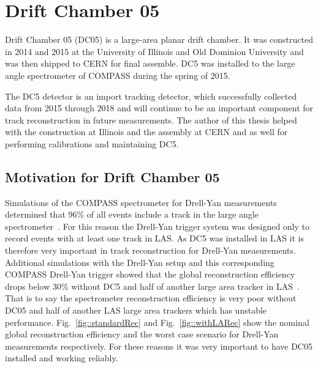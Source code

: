 \chapter{Drift Chamber 05} \label{ch::DC05}
\ifpdf
\graphicspath{{Chapters/DC5/Figs/Raster/}{Chapters/DC5/Figs/PDF/}{Chapters/DC5/Figs/}}
\else \graphicspath{{Chapters/DC5/Figs/Vector/}{Chapters/DC5/Figs/}}
\fi

Drift Chamber 05 (DC05) is a large-area planar drift chamber.  It was
constructed in 2014 and 2015 at the University of Illinois and Old Dominion
University and was then shipped to CERN for final assemble.  DC5 was installed
to the large angle spectrometer of COMPASS during the spring of 2015.

The DC5 detector is an import tracking detector, which successfully collected
data from 2015 through 2018 and will continue to be an important component for
track reconstruction in future measurements.  The author of this thesis helped
with the construction at Illinois and the assembly at CERN and as well for
performing calibrations and maintaining DC5.


\section{Motivation for Drift Chamber 05}

Simulations of the COMPASS spectrometer for Drell-Yan measurements determined
that 96\% of all events include a track in the large angle
spectrometer~\cite{proposal}.  For this reason the Drell-Yan trigger system was
designed only to record events with at least one track in LAS.  As DC5 was
installed in LAS it is therefore very important in track reconstruction for
Drell-Yan measurements.  Additional simulations with the Drell-Yan setup and
this corresponding COMPASS Drell-Yan trigger showed that the global
reconstruction efficiency drops below 30\% without DC5 and half of another large
area tracker in LAS~\cite{quintans_rec_march12}.  That is to say the
spectrometer reconstruction efficiency is very poor without DC05 and half of
another LAS large area trackers which has unstable performance.
Fig.~\ref{fig::standardRec} and Fig.~\ref{fig::withLARec} show the nominal
global reconstruction efficiency and the worst case scenario for Drell-Yan
measurements respectively.  For these reasons it was very important to have DC05
installed and working reliably.

